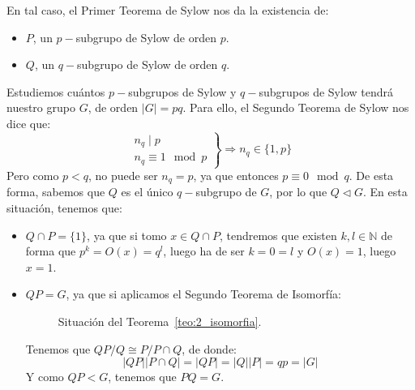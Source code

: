 \noindent
En tal caso, el Primer Teorema de Sylow nos da la existencia de:
\begin{itemize}
    \item $P$, un $p-$subgrupo de Sylow de orden $p$.
    \item $Q$, un $q-$subgrupo de Sylow de orden $q$.
\end{itemize}
Estudiemos cuántos $p-$subgrupos de Sylow y $q-$subgrupos de Sylow tendrá nuestro grupo $G$, de orden $|G| = pq$. Para ello, el Segundo Teorema de Sylow nos dice que:
\begin{equation*}
    \left.\begin{array}{r}
        n_q \mid p \\
        n_q\equiv 1 \mod p
    \end{array}\right\} \Longrightarrow n_q \in \{1,p\}
\end{equation*}
Pero como $p<q$, no puede ser $n_q = p$, ya que entonces $p\equiv 0 \mod q$. De esta forma, sabemos que $Q$ es el único $q-$subgrupo de $G$, por lo que $Q\lhd G$. En esta situación, tenemos que:
\begin{itemize}
    \item $Q\cap P = \{1\}$, ya que si tomo $x\in Q\cap P$, tendremos que existen $k,l\in \mathbb{N}$ de forma que $p^k = O(x) = q^l$, luego ha de ser $k = 0 = l$ y $O(x) = 1$, luego $x = 1$.
    \item $QP = G$, ya que si aplicamos el Segundo Teorema de Isomorfía:
\begin{figure}[H]
    \centering
    \caption{Situación del Teorema~\ref{teo:2_isomorfia}.}
    \label{fig:2_isomorfia}
\end{figure}
    Tenemos que $QP/Q \cong P/P\cap Q$, de donde:
    \begin{equation*}
        |QP||P\cap Q| = |QP| = |Q||P| = qp = |G|
    \end{equation*}
    Y como $QP < G$, tenemos que $PQ = G$.
\end{itemize}
